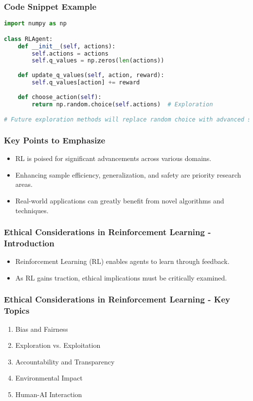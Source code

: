 \documentclass[aspectratio=169]{beamer}
\begin{document}
\begin{frame}[fragile]
    \frametitle{Code Snippet Example}
    \begin{lstlisting}[language=Python]
import numpy as np

class RLAgent:
    def __init__(self, actions):
        self.actions = actions
        self.q_values = np.zeros(len(actions))
    
    def update_q_values(self, action, reward):
        self.q_values[action] += reward
    
    def choose_action(self):
        return np.random.choice(self.actions)  # Exploration

# Future exploration methods will replace random choice with advanced strategies.
    \end{lstlisting}
\end{frame}

\begin{frame}
    \frametitle{Key Points to Emphasize}
    \begin{itemize}
        \item RL is poised for significant advancements across various domains.
        \item Enhancing sample efficiency, generalization, and safety are priority research areas.
        \item Real-world applications can greatly benefit from novel algorithms and techniques.
    \end{itemize}
\end{frame}

\begin{frame}[fragile]
    \frametitle{Ethical Considerations in Reinforcement Learning - Introduction}
    \begin{itemize}
        \item Reinforcement Learning (RL) enables agents to learn through feedback.
        \item As RL gains traction, ethical implications must be critically examined.
    \end{itemize}
\end{frame}

\begin{frame}[fragile]
    \frametitle{Ethical Considerations in Reinforcement Learning - Key Topics}
    \begin{enumerate}
        \item Bias and Fairness
        \item Exploration vs. Exploitation
        \item Accountability and Transparency
        \item Environmental Impact
        \item Human-AI Interaction
    \end{enumerate}
\end{frame}
\end{document}
